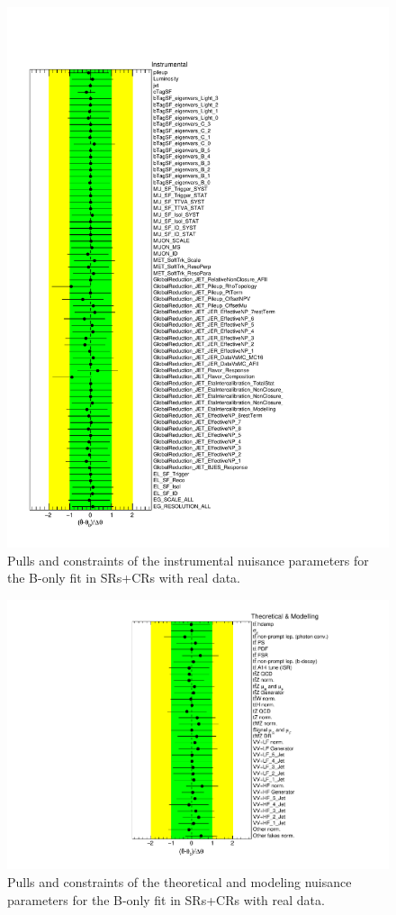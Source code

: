 \begin{figure}[htbp]
	\centering
	\includegraphics[width=.8\textwidth]{Chapters/CH8/figures/BONLY_CRSR_DL1rc_unblind/NuisPar_Instrumental}
	\caption{Pulls and constraints of the instrumental nuisance parameters for the B-only \tZc fit in SRs+CRs with real data.}%
	\label{fig:stat:tzc:splusb:crsr:np:instr_unb}
\end{figure}

\begin{figure}[htbp]
	\centering
	\includegraphics[width=.85\textwidth]{Chapters/CH8/figures/BONLY_CRSR_DL1rc_unblind/NuisPar_Theoretical_&_Modelling}
	\caption{Pulls and constraints of the theoretical and modeling nuisance parameters for the B-only \tZc fit in SRs+CRs with real data.}%
	\label{fig:stat:tzc:splusb:crsr:np:model_unb}
\end{figure}

